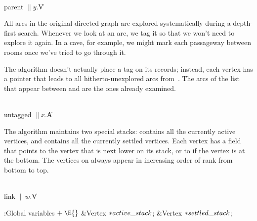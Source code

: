 \Y\B\4\D\\{parent}\5
$\|y.{}$\|V\par
\fi

All arcs in the original directed graph are explored systematically during
a depth-first search. Whenever we look at an arc, we tag it so that
we won't need to explore it again. In a cave, for example, we might
mark each passageway between rooms once we've tried to go through it.

The algorithm doesn't actually place a tag on its  records;
instead,
each vertex  has a pointer  that leads to all
hitherto-unexplored arcs from~. The arcs of the list that appear
between  and  are the ones
already examined.

\Y\B\4\D\\{untagged}\5
$\|x.{}$\|A\par
\fi

The algorithm maintains two special stacks: 
contains
all the currently active vertices, and  contains all the
currently settled vertices. Each vertex has a  field that points
to the vertex that is next lower on its stack, or to \PB{$\NULL$} if the vertex
is
at the bottom. The vertices on  always appear in
increasing
order of rank from bottom to top.

\Y\B\4\D\\{link}\5
$\|w.{}$\|V\par
\Y\B\4:Global variables\X${}\mathrel+\E{}$\6
\&{Vertex} ${}{*}\\{active\_stack}{}$;\6
\&{Vertex} ${}{*}\\{settled\_stack}{}$;\par
\fi

